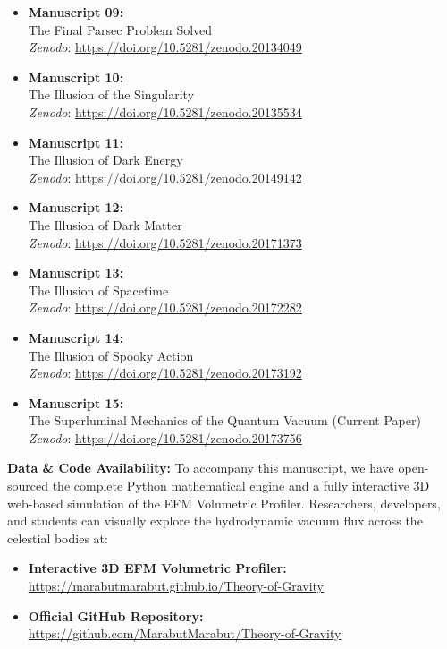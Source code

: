 \documentclass[11pt, a4paper]{article}
\begin{document}
\begin{itemize}
    \item \textbf{Manuscript 09:} \\ The Final Parsec Problem Solved \\ \textit{Zenodo}: \url{https://doi.org/10.5281/zenodo.20134049}

    \item \textbf{Manuscript 10:} \\ The Illusion of the Singularity \\ \textit{Zenodo}: \url{https://doi.org/10.5281/zenodo.20135534}
    
    \item \textbf{Manuscript 11:} \\ The Illusion of Dark Energy \\ \textit{Zenodo}: \url{https://doi.org/10.5281/zenodo.20149142}
    
    \item \textbf{Manuscript 12:} \\ The Illusion of Dark Matter \\ \textit{Zenodo}: \url{https://doi.org/10.5281/zenodo.20171373}

    \item \textbf{Manuscript 13:} \\ The Illusion of Spacetime \\ \textit{Zenodo}: \url{https://doi.org/10.5281/zenodo.20172282}

    \item \textbf{Manuscript 14:} \\ The Illusion of Spooky Action \\ \textit{Zenodo}: \url{https://doi.org/10.5281/zenodo.20173192}

    \item \textbf{Manuscript 15:} \\ The Superluminal Mechanics of the Quantum Vacuum (Current Paper) \\ \textit{Zenodo}: \url{https://doi.org/10.5281/zenodo.20173756}
  \end{itemize}

  \vspace{1em}
  \noindent \textbf{Data \& Code Availability:} To accompany this manuscript, we have open-sourced the complete Python mathematical engine and a fully interactive 3D web-based simulation of the EFM Volumetric Profiler. Researchers, developers, and students can visually explore the hydrodynamic vacuum flux across the celestial bodies at: 
  \begin{itemize}
    \item \textbf{Interactive 3D EFM Volumetric Profiler:} \\ \url{https://marabutmarabut.github.io/Theory-of-Gravity}
    
    \item \textbf{Official GitHub Repository:} \\ \url{https://github.com/MarabutMarabut/Theory-of-Gravity}
  \end{itemize}
\end{document}
